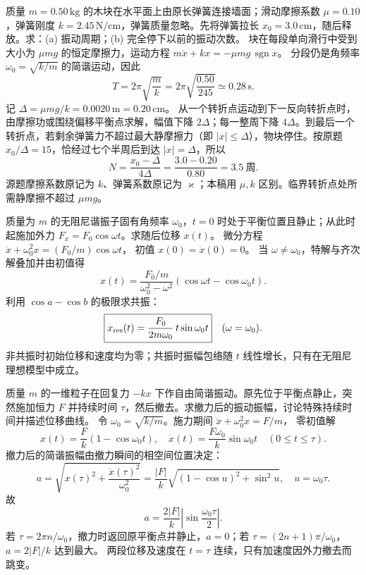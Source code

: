质量 $m=0.50\,\mathrm{kg}$ 的木块在水平面上由原长弹簧连接墙面；滑动摩擦系数 $\mu=0.10$，弹簧刚度 $k=2.45\,\mathrm{N/cm}$，弹簧质量忽略。先将弹簧拉长 $x_0=3.0\,\mathrm{cm}$，随后释放。求：(a) 振动周期；(b) 完全停下以前的振动次数。
\exsolution
块在每段单向滑行中受到大小为 $\mu mg$ 的恒定摩擦力，运动方程
$m\ddot x+kx=-\mu mg\,\operatorname{sgn}\dot x$。
分段仍是角频率 $\omega_0=\sqrt{k/m}$ 的简谐运动，因此
\[
\boxed{T=2\pi\sqrt{\frac mk}
=2\pi\sqrt{\frac{0.50}{245}}\simeq0.28\,\mathrm s}.
\]
记 $\Delta=\mu mg/k=0.0020\,\mathrm m=0.20\,\mathrm{cm}$。
从一个转折点运动到下一反向转折点时，由摩擦功或围绕偏移平衡点求解，幅值下降 $2\Delta$；每一整周下降 $4\Delta$。到最后一个转折点，若剩余弹簧力不超过最大静摩擦力（即 $|x|\le\Delta$），物块停住。按原题 $x_0/\Delta=15$，恰经过七个半周后到达 $|x|=\Delta$，所以
\[
\boxed{N=\frac{x_0-\Delta}{4\Delta}
=\frac{3.0-0.20}{0.80}=3.5\ \text{周}}.
\]
\excheck 源题摩擦系数原记为 $k$、弹簧系数原记为 $\varkappa$；本稿用 $\mu,k$ 区别。临界转折点处所需静摩擦不超过 $\mu mg$。

质量为 $m$ 的无阻尼谐振子固有角频率 $\omega_0$，$t=0$ 时处于平衡位置且静止；从此时起施加外力 $F_x=F_0\cos\omega t$。求随后位移 $x(t)$。
\exsolution
微分方程
$\ddot x+\omega_0^2x=(F_0/m)\cos\omega t$，
初值 $x(0)=\dot x(0)=0$。
当 $\omega\ne\omega_0$，特解与齐次解叠加并由初值得
\[
\boxed{x(t)=\frac{F_0/m}{\omega_0^2-\omega^2}
\left(\cos\omega t-\cos\omega_0t\right)}.
\]
利用 $\cos a-\cos b$ 的极限求共振：
\[
\boxed{x_{\rm res}(t)=\frac{F_0}{2m\omega_0}
\,t\sin\omega_0t}\quad(\omega=\omega_0).
\]
\excheck 非共振时初始位移和速度均为零；共振时振幅包络随 $t$ 线性增长，只有在无阻尼理想模型中成立。

质量 $m$ 的一维粒子在回复力 $-kx$ 下作自由简谐振动。原先位于平衡点静止，突然施加恒力 $F$ 并持续时间 $\tau$，然后撤去。求撤力后的振动振幅，讨论特殊持续时间并描述位移曲线。
\exsolution
令 $\omega_0=\sqrt{k/m}$。施力期间
$\ddot x+\omega_0^2x=F/m$，
零初值解
\[
x(t)=\frac Fk(1-\cos\omega_0t),\quad
\dot x(t)=\frac{F\omega_0}{k}\sin\omega_0t
\quad(0\le t\le\tau).
\]
撤力后的简谐振幅由撤力瞬间的相空间位置决定：
\[
a=\sqrt{x(\tau)^2+\frac{\dot x(\tau)^2}{\omega_0^2}}
=\frac{|F|}{k}\sqrt{(1-\cos u)^2+\sin^2u},
\quad u=\omega_0\tau.
\]
故
\[
\boxed{a=\frac{2|F|}{k}
\left|\sin\frac{\omega_0\tau}{2}\right|}.
\]
若 $\tau=2\pi n/\omega_0$，撤力时返回原平衡点并静止，$a=0$；若 $\tau=(2n+1)\pi/\omega_0$，$a=2|F|/k$ 达到最大。
\excheck 两段位移及速度在 $t=\tau$ 连续，只有加速度因外力撤去而跳变。


